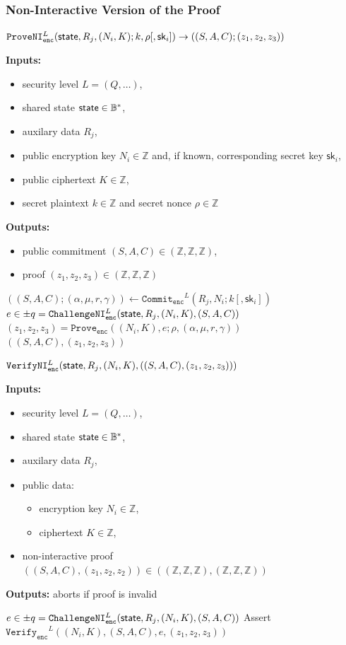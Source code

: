 \documentclass[11pt]{article}
\newenvironment{inlineAlgorithm}{}{}
\newcommand{\algoName}[1]{#1 \par}
\newcommand{\algoInputsList}[1]{
    {\small \bf Inputs:} 
        \begin{itemize}[noitemsep,topsep=0pt]
            #1
        \end{itemize}
}
\newcommand{\algoOutputs}[1]{
    {\small \bf Outputs:} #1 \par
}
\newcommand{\algoOutputsList}[1]{
    {\small \bf Outputs:}
        \begin{itemize}[noitemsep,topsep=0pt]
            #1
        \end{itemize}
}
\def\state{{\sf state}}
\newcommand{\commit}[1]{\ensuremath{\mathtt{Commit}_{\mathtt{#1}}}}
\newcommand{\challengeni}[1]{\ensuremath{\mathtt{ChallengeNI}_{\mathtt{#1}}}}
\newcommand{\prove}[1]{\ensuremath{\mathtt{Prove}_{\mathtt{#1}}}}
\newcommand{\proveni}[1]{\ensuremath{\mathtt{ProveNI}_{\mathtt{#1}}}}
\newcommand{\verify}[1]{\ensuremath{\mathtt{Verify}_{\mathtt{#1}}}}
\newcommand{\verifyni}[1]{\ensuremath{\mathtt{VerifyNI}_{\mathtt{#1}}}}
\newcommand{\sk}{\textsf{sk}}
\newcommand{\Z}{\mathbb{Z}}
\newcommand{\?}[1]{\stackrel{?}{#1}}
\newcommand{\Byte}{\ensuremath{\mathbb{B}}}
\begin{document}
\subsubsection{Non-Interactive Version of the Proof}

\begin{description}

\item
\begin{inlineAlgorithm}
\algoName{$\proveni{enc}^L(\state, R_j, (N_i, K); k, \rho[, \sk_i]) \to ((S, A, C); (z_1, z_2, z_3))$}
\algoInputsList{
    \item security level $L = (Q, \dots)$,
    \item shared state $\state \in \Byte^*$,
    \item auxilary data $R_j$,
    \item public encryption key $N_i \in \Z$ and, if known, corresponding secret key $\sk_i$,
    \item public ciphertext $K \in \Z$,
    \item secret plaintext $k \in \Z$ and secret nonce $\rho \in \Z$
}
\algoOutputsList{
    \item public commitment $(S, A, C) \in (\Z, \Z, \Z)$,
    \item proof $(z_1, z_2, z_3) \in (\Z, \Z, \Z)$
}
\begin{algorithmic}[1]
\State $((S, A, C); (\alpha, \mu, r, \gamma)) \gets \commit{enc}^L(R_j, N_i; k[, \sk_i])$
\State $e \in \pm q = \challengeni{enc}^L(\state, R_j, (N_i, K), (S, A, C))$
\State $(z_1, z_2, z_3) = \prove{enc}((N_i, K), e; \rho, (\alpha, \mu, r, \gamma))$
\State \Return $((S, A, C), (z_1, z_2, z_3))$
\end{algorithmic}
\end{inlineAlgorithm}

\item
\begin{inlineAlgorithm}
\algoName{$\verifyni{enc}^L(\state, R_j, (N_i, K), ((S, A, C), (z_1, z_2, z_3)))$}
\algoInputsList{
    \item security level $L = (Q, \dots)$,
    \item shared state $\state \in \Byte^*$,
    \item auxilary data $R_j$,
    \item public data:
        \begin{itemize}
        \item encryption key $N_i \in \Z$,
        \item ciphertext $K \in \Z$,
        \end{itemize}
    \item non-interactive proof $((S, A, C), (z_1, z_2, z_2)) \in ((\Z, \Z, \Z), (\Z, \Z, \Z))$
}
\algoOutputs{aborts if proof is invalid}
\begin{algorithmic}[1]
\State $e \in \pm q = \challengeni{enc}^L(\state, R_j, (N_i, K), (S, A, C))$
\State Assert $\verify{enc}^L((N_i, K), (S, A, C), e, (z_1, z_2, z_3))$
\end{algorithmic}
\end{inlineAlgorithm}


\end{description}
\end{document}
